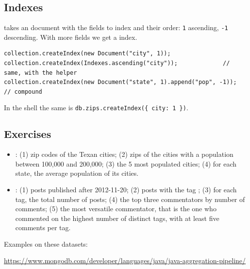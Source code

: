 \subsection{Indexes}
 takes an  document with the fields to index and their order: \texttt{1} ascending, \texttt{-1} descending. With more fields we get a  index.
\begin{lstlisting}
collection.createIndex(new Document("city", 1));
collection.createIndex(Indexes.ascending("city"));             // same, with the helper
collection.createIndex(new Document("state", 1).append("pop", -1));  // compound
\end{lstlisting}
In the shell the same is \texttt{db.zips.createIndex(\{ city: 1 \})}.

\subsection{Exercises}
\begin{itemize}
  \item {}: (1) zip codes of the Texan cities; (2) zips of the cities with a population between 100{,}000 and 200{,}000; (3) the 5 most populated cities; (4) for each state, the average population of its cities.
  \item {}: (1) posts published after 2012-11-20; (2) posts with the tag ; (3) for each tag, the total number of posts; (4) the top three commentators by number of comments; (5) the most versatile commentator, that is the one who commented on the highest number of distinct tags, with at least five comments per tag.
\end{itemize}
Examples on these datasets:
\begin{center}\small\url{https://www.mongodb.com/developer/languages/java/java-aggregation-pipeline/}\end{center}
